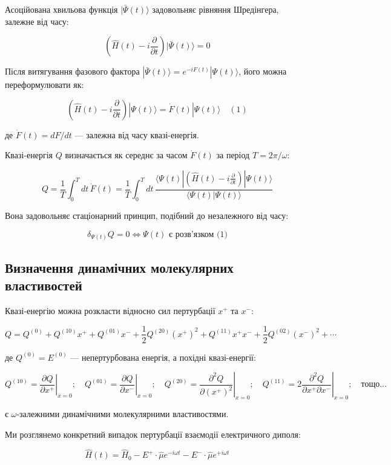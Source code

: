 \documentclass{PySCFBook}
\begin{document}
Асоційована хвильова функція \(|\bar{\Psi}(t)\rangle\) задовольняє рівняння Шредінгера, залежне від часу:

\[\left( \hat{H}(t) - i \frac{\partial}{\partial t} \right) |\bar{\Psi}(t)\rangle = 0\]

Після витягування фазового фактора \(|\bar{\Psi}(t)\rangle = e^{-i F(t)} |\Psi(t)\rangle\), його можна переформулювати як:

\[\left( \hat{H}(t) - i \frac{\partial}{\partial t} \right) |\Psi(t)\rangle = \dot{F}(t) |\Psi(t)\rangle \quad (1)\]

де \(\dot{F}(t) = dF/dt\) — залежна від часу квазі-енергія.

Квазі-енергія \(Q\) визначається як середнє за часом \(\dot{F}(t)\) за період \(T = 2\pi / \omega\):

\[Q = \frac{1}{T} \int_0^T dt \, \dot{F}(t) = \frac{1}{T} \int_0^T dt \, \frac{\langle \Psi(t) | \left( \hat{H}(t) - i \frac{\partial}{\partial t} \right) | \Psi(t) \rangle}{\langle \Psi(t) | \Psi(t) \rangle}\]

Вона задовольняє стаціонарний принцип, подібний до незалежного від часу:

\[\delta_{\Psi(t)} Q = 0 \iff \Psi(t) \text{ є розв'язком (1)}\]

\subsection{Визначення динамічних молекулярних властивостей}

Квазі-енергію можна розкласти відносно сил пертурбації \(x^+\) та \(x^-\):

\[Q = Q^{(0)} + Q^{(10)} x^+ + Q^{(01)} x^- + \frac{1}{2} Q^{(20)} (x^+)^2 + Q^{(11)} x^+ x^- + \frac{1}{2} Q^{(02)} (x^-)^2 + \cdots\]

де \(Q^{(0)} = E^{(0)}\) — непертурбована енергія, а похідні квазі-енергії:

\[Q^{(10)} = \left. \frac{\partial Q}{\partial x^+} \right|_{x=0}; \quad Q^{(01)} = \left. \frac{\partial Q}{\partial x^-} \right|_{x=0}; \quad Q^{(20)} = \left. \frac{\partial^2 Q}{\partial (x^+)^2} \right|_{x=0}; \quad Q^{(11)} = 2 \left. \frac{\partial^2 Q}{\partial x^+ \partial x^-} \right|_{x=0}; \quad \text{тощо...}\]

є \(\omega\)-залежними динамічними молекулярними властивостями.

Ми розглянемо конкретний випадок пертурбації взаємодії електричного диполя:

\[\hat{H}(t) = \hat{H}_0 - E^+ \cdot \hat{\mu} e^{-i \omega t} - E^- \cdot \hat{\mu} e^{+i \omega t}\]
\end{document}
